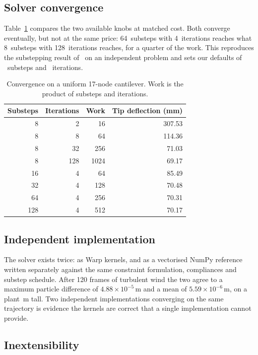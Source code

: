 \documentclass[conference]{IEEEtran}
\begin{document}
\subsection{Solver convergence}
\label{sec:convergence}

Table~\ref{tab:convergence} compares the two available knobs at matched cost.
Both converge eventually, but not at the same price: 64~substeps with
4~iterations reaches what 8~substeps with 128~iterations reaches, for a
quarter of the work. This reproduces the substepping result
of~\cite{macklin2019smallsteps} on an independent problem and sets our
defaults of \Substeps{}~substeps and \Iterations{}~iterations.

\begin{table}[t]
\caption{Convergence on a uniform 17-node cantilever. Work is the product of
substeps and iterations.}
\label{tab:convergence}
\centering
\begin{tabular}{rrrr}
\toprule
Substeps & Iterations & Work & Tip deflection (mm) \\
\midrule
8   & 2   & 16   & 307.53 \\
8   & 8   & 64   & 114.36 \\
8   & 32  & 256  & 71.03 \\
8   & 128 & 1024 & 69.17 \\
16  & 4   & 64   & 85.49 \\
32  & 4   & 128  & 70.48 \\
64  & 4   & 256  & 70.31 \\
128 & 4   & 512  & 70.17 \\
\bottomrule
\end{tabular}
\end{table}

\subsection{Independent implementation}

The solver exists twice: as Warp kernels, and as a vectorised NumPy reference
written separately against the same constraint formulation, compliances and
substep schedule. After 120 frames of turbulent wind the two agree to a
maximum particle difference of $4.88\times10^{-5}$\,m and a mean of
$5.59\times10^{-6}$\,m, on a plant \StemLength{}\,m tall. Two independent
implementations converging on the same trajectory is evidence the kernels are
correct that a single implementation cannot provide.

\subsection{Inextensibility}
\end{document}
